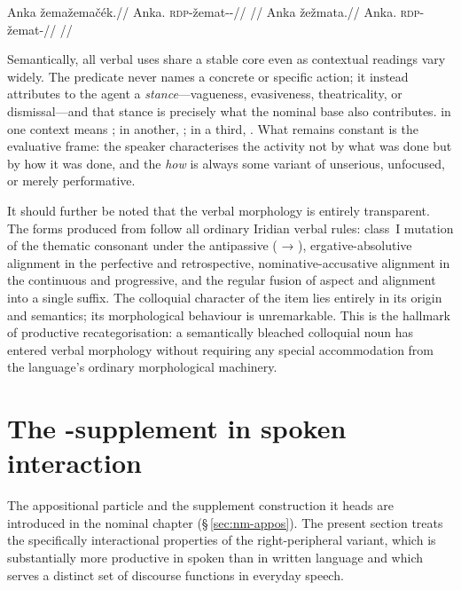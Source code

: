 \pex
\a
\begingl
\gla Anka žemažemačék.//
\glb Anka.\Dir{} \textsc{rdp}-žemat-\Antip{}-\Pf{}//
\glft {}//
\endgl
\a
\begingl
\gla Anka žežmata.//
\glb Anka.\Dir{} \textsc{rdp}-žemat-\Cont{}//
\glft {}//
\endgl
\xe

Semantically, all verbal uses share a stable core even as contextual readings
vary widely. The predicate never names a concrete or specific action; it instead
attributes to the agent a \emph{stance}---vagueness, evasiveness, theatricality,
or dismissal---and that stance is precisely what the nominal base also
contributes.  in one context means ; in another, ; in a third, . What remains constant is the evaluative frame: the
speaker characterises the activity not by what was done but by how it was done,
and the \textit{how} is always some variant of unserious, unfocused, or merely
performative.

It should further be noted that the verbal morphology is entirely transparent.
The forms produced from  follow all ordinary Iridian verbal rules:
class~I mutation of the thematic consonant under the antipassive ( →
), ergative-absolutive alignment in the perfective and retrospective,
nominative-accusative alignment in the continuous and progressive, and the
regular fusion of aspect and alignment into a single suffix. The colloquial
character of the item lies entirely in its origin and semantics; its
morphological behaviour is unremarkable. This is the hallmark of productive
recategorisation: a semantically bleached colloquial noun has entered verbal
morphology without requiring any special accommodation from the language's
ordinary morphological machinery.

\section{The -supplement in spoken interaction}
\label{sec:spoken-ty}

The appositional particle  and the supplement construction it heads
are introduced in the nominal chapter (\S\,\ref{sec:nm-appos}). The present
section treats the specifically interactional properties of the
right-peripheral variant, which is substantially more productive in spoken
than in written language and which serves a distinct set of discourse functions
in everyday speech.

